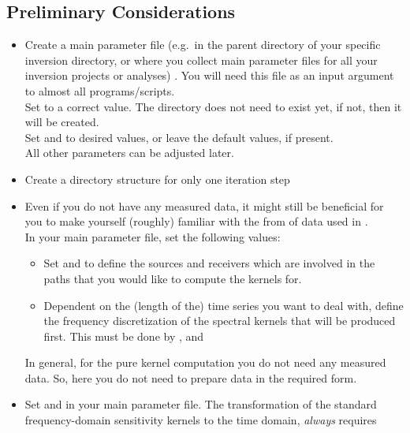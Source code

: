 \subsection*{Preliminary Considerations}
%
\begin{itemize}
\item Create a main parameter file (e.g.\ in the parent directory of your specific inversion directory, 
or where you collect main parameter files for all your inversion projects or analyses)
. You will need this file as an input argument to almost all programs/scripts.\\
Set  to a correct value.
The directory does not need to exist yet, if not, then it will be created. \\
Set  and 
 to desired values, 
or leave the default values, if present.\\
All other parameters can be adjusted later. 
%
\item Create a directory structure for only one iteration step 
%
\item Even if you do not have any measured data, it might still be beneficial for you to make yourself 
(roughly) familiar with the from of data used in \ASKI {}. \\
In your main parameter file, set the following values: 
  \begin{itemize}
  \item Set  and  to define the sources and receivers which are
    involved in the paths that you would like to compute the kernels for. 
  \item Dependent on the (length of the) time series you want to deal with, define the frequency discretization of the
    spectral kernels that will be produced first. This must be done by , 
     and 
  \end{itemize}
In general, for the pure kernel computation you do not need any measured data. So, here you do not need to prepare
data in the \ASKI required form.
%
\item Set  and  in your main parameter file. The transformation 
  of the standard frequency-domain sensitivity kernels to the time domain, \emph{always} requires 

\end{itemize}

